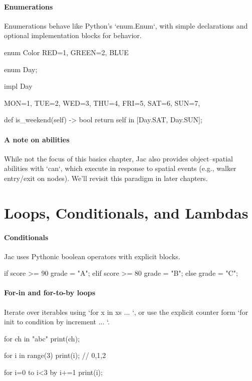 \paragraph{Enumerations}

Enumerations behave like Python's `enum.Enum`, with simple declarations and optional implementation blocks for behavior.

\begin{jacblock}
enum Color { RED=1, GREEN=2, BLUE }

enum Day;

impl Day {
    MON=1, TUE=2, WED=3, THU=4, FRI=5, SAT=6, SUN=7,

    def is_weekend(self) -> bool { return self in [Day.SAT, Day.SUN]; }
}
\end{jacblock}

\paragraph{A note on abilities}

While not the focus of this basics chapter, Jac also provides object–spatial abilities with `can`, which execute in response to spatial events (e.g., walker entry/exit on nodes). We'll revisit this paradigm in later chapters.

\section{Loops, Conditionals, and Lambdas}

\paragraph{Conditionals}

Jac uses Pythonic boolean operators with explicit blocks.

\begin{jacblock}
if score >= 90 {
    grade = "A";
} elif score >= 80 {
    grade = "B";
} else {
    grade = "C";
}
\end{jacblock}

\paragraph{For-in and for-to-by loops}

Iterate over iterables using `for x in xs { ... }`, or use the explicit counter form `for init to condition by increment { ... }`.

\begin{jacblock}
for ch in "abc" { print(ch); }

for i in range(3) {
    print(i);  // 0,1,2
}

for i=0 to i<3 by i+=1 {
    print(i);
}
\end{jacblock}

